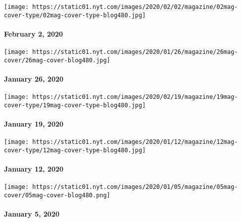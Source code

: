 \href{https://www.nytimes.com/issue/magazine/2020/01/30/the-2220-issue}{}

\texttt{[image: https://static01.nyt.com/images/2020/02/02/magazine/02mag-cover-type/02mag-cover-type-blog480.jpg]}

\hypertarget{february-2-2020}{%
\paragraph{February 2, 2020}\label{february-2-2020}}

\href{https://www.nytimes.com/issue/magazine/2020/01/23/the-12620-issue}{}

\texttt{[image: https://static01.nyt.com/images/2020/01/26/magazine/26mag-cover/26mag-cover-blog480.jpg]}

\hypertarget{january-26-2020}{%
\paragraph{January 26, 2020}\label{january-26-2020}}

\href{https://www.nytimes.com/issue/magazine/2020/01/21/the-11920-issue}{}

\texttt{[image: https://static01.nyt.com/images/2020/02/19/magazine/19mag-cover-type/19mag-cover-type-blog480.jpg]}

\hypertarget{january-19-2020}{%
\paragraph{January 19, 2020}\label{january-19-2020}}

\href{https://www.nytimes.com/issue/magazine/2020/01/09/the-11220-issue}{}

\texttt{[image: https://static01.nyt.com/images/2020/01/12/magazine/12mag-cover-type/12mag-cover-type-blog480.jpg]}

\hypertarget{january-12-2020}{%
\paragraph{January 12, 2020}\label{january-12-2020}}

\href{https://www.nytimes.com/issue/magazine/2020/01/02/the-1520-issue}{}

\texttt{[image: https://static01.nyt.com/images/2020/01/05/magazine/05mag-cover/05mag-cover-blog480.png]}

\hypertarget{january-5-2020}{%
\paragraph{January 5, 2020}\label{january-5-2020}}

